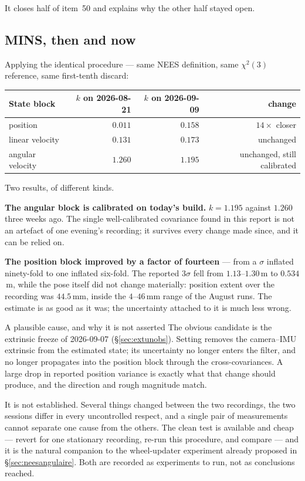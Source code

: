 It closes half of item~50 and explains why the other half stayed open.

\subsection{MINS, then and now}

Applying the identical procedure --- same NEES definition, same
$\chi^2(3)$ reference, same first-tenth discard:

\begin{center}
\begin{tabular}{@{}lrrr@{}}
\toprule
State block & $k$ on 2026-08-21 & $k$ on 2026-09-09 & change \\
\midrule
position          & $0.011$ & $\mathbf{0.158}$ & $14\times$ closer \\
linear velocity   & $0.131$ & $0.173$ & unchanged \\
angular velocity  & $1.260$ & $\mathbf{1.195}$ & unchanged, still calibrated \\
\bottomrule
\end{tabular}
\end{center}

\noindent Two results, of different kinds.

\textbf{The angular block is calibrated on today's build.} $k = 1.195$
against $1.260$ three weeks ago. The single well-calibrated covariance
found in this report is not an artefact of one evening's recording; it
survives every change made since, and it can be relied on.

\textbf{The position block improved by a factor of fourteen} --- from a
$\sigma$ inflated ninety-fold to one inflated six-fold. The reported
$3\sigma$ fell from $1.13$--$1.30$\,m to $0.534$\,m, while the pose itself
did not change materially: position extent over the recording was
$44.5$\,mm, inside the $4$--$46$\,mm range of the August runs. The estimate
is as good as it was; the uncertainty attached to it is much less wrong.

\begin{trapbox}{A plausible cause, and why it is not asserted}
The obvious candidate is the extrinsic freeze of 2026-09-07
(\S\ref{sec:extunobs}). Setting  removes the
camera--IMU extrinsic from the estimated state; its uncertainty no longer
enters the filter, and no longer propagates into the position block through
the cross-covariances. A large drop in reported position variance is
exactly what that change should produce, and the direction and rough
magnitude match.

It is not established. Several things changed between the two recordings,
the two sessions differ in every uncontrolled respect, and a single pair of
measurements cannot separate one cause from the others. The clean test is
available and cheap --- revert  for one stationary
recording, re-run this procedure, and compare --- and it is the natural
companion to the wheel-updater experiment already proposed in
\S\ref{sec:neesangulaire}. Both are recorded as experiments to run, not as
conclusions reached.
\end{trapbox}

